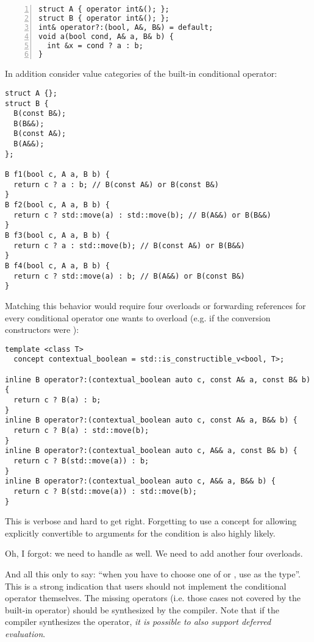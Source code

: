 \begin{lstlisting}[style=Vc,numbers=left,float,label=lst:use cases,caption={
Use cases a defaulted conditional operator should support.
}]
struct A { operator int&(); };
struct B { operator int&(); };
int& operator?:(bool, A&, B&) = default;
void a(bool cond, A& a, B& b) {
  int &x = cond ? a : b;
}
\end{lstlisting}

In addition consider value categories of the built-in conditional operator:
\medskip\begin{lstlisting}[style=Vc]
struct A {};
struct B {
  B(const B&);
  B(B&&);
  B(const A&);
  B(A&&);
};

B f1(bool c, A a, B b) {
  return c ? a : b; // B(const A&) or B(const B&)
}
B f2(bool c, A a, B b) {
  return c ? std::move(a) : std::move(b); // B(A&&) or B(B&&)
}
B f3(bool c, A a, B b) {
  return c ? a : std::move(b); // B(const A&) or B(B&&)
}
B f4(bool c, A a, B b) {
  return c ? std::move(a) : b; // B(A&&) or B(const B&)
}
\end{lstlisting}
Matching this behavior would require four overloads or forwarding references for every conditional operator one wants to overload (e.g. if the conversion constructors were ):
\medskip\begin{lstlisting}[style=Vc]
template <class T>
  concept contextual_boolean = std::is_constructible_v<bool, T>;

inline B operator?:(contextual_boolean auto c, const A& a, const B& b) {
  return c ? B(a) : b;
}
inline B operator?:(contextual_boolean auto c, const A& a, B&& b) {
  return c ? B(a) : std::move(b);
}
inline B operator?:(contextual_boolean auto c, A&& a, const B& b) {
  return c ? B(std::move(a)) : b;
}
inline B operator?:(contextual_boolean auto c, A&& a, B&& b) {
  return c ? B(std::move(a)) : std::move(b);
}
\end{lstlisting}
This is verbose and hard to get right.
Forgetting to use a concept for allowing explicitly convertible to \bool arguments for the condition is also highly likely.

Oh, I forgot: we need to handle  as well.
We need to add another four overloads.

And all this only to say: “when you have to choose one of  or , use  as the type”.
This is a strong indication that users should not implement the conditional operator themselves.
The missing operators (i.e. those cases not covered by the built-in operator) should be synthesized by the compiler.
Note that if the compiler synthesizes the operator, \emph{it is possible to also support deferred evaluation}.

